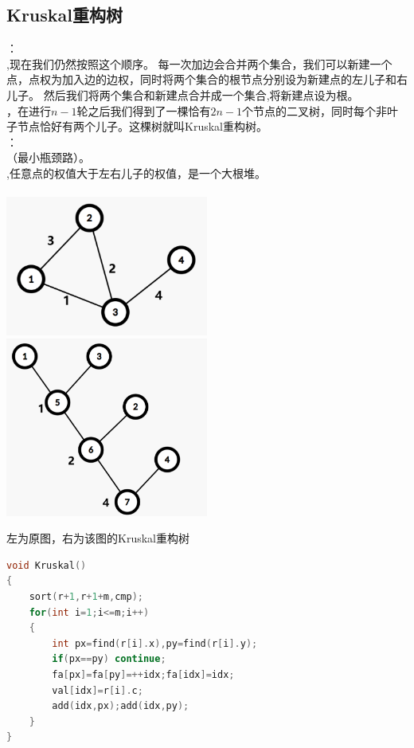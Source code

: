 \documentclass[a4paper]{book}
\begin{document}
\subsection{Kruskal重构树}
：\\
,现在我们仍然按照这个顺序。
每一次加边会合并两个集合，我们可以新建一个点，点权为加入边的边权，同时将两个集合的根节点分别设为新建点的左儿子和右儿子。
然后我们将两个集合和新建点合并成一个集合,将新建点设为根。\\
，在进行$n-1$轮之后我们得到了一棵恰有$2n-1$个节点的二叉树，同时每个非叶子节点恰好有两个儿子。这棵树就叫Kruskal重构树。\\
：\\
（最小瓶颈路）。\\
,任意点的权值大于左右儿子的权值，是一个大根堆。\\
\\
\includegraphics[width=0.5\textwidth]{../photo/kru1}
\includegraphics[width=0.5\textwidth]{../photo/kru2}
\begin{center}
    左为原图，右为该图的Kruskal重构树
\end{center}
\begin{lstlisting}[language=C++]
void Kruskal()
{
    sort(r+1,r+1+m,cmp);
    for(int i=1;i<=m;i++)
    {
        int px=find(r[i].x),py=find(r[i].y);
        if(px==py) continue;
        fa[px]=fa[py]=++idx;fa[idx]=idx;
        val[idx]=r[i].c;
        add(idx,px);add(idx,py);
    }
}
\end{lstlisting}
\end{document}
